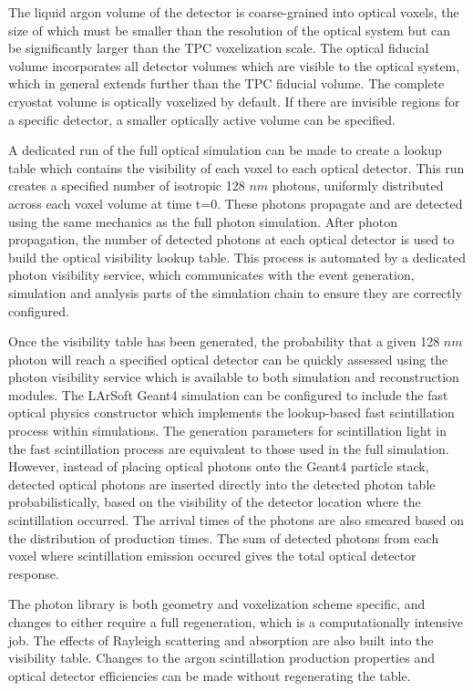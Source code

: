 \documentclass[12pt]{elsarticle}
\newcommand{\larsoft}{LArSoft }
\begin{document}
The liquid argon volume of the detector is coarse-grained into optical voxels, the size of which must be smaller than the resolution of the optical system but can be significantly larger than the TPC voxelization scale.  The optical fiducial volume incorporates all detector volumes which are visible to the optical system, which in general extends further than the TPC fiducial volume.  The complete cryostat volume is optically voxelized by default. If there are invisible regions for a specific detector, a smaller optically active volume can be specified.

A dedicated run of the full optical simulation can be made to create a lookup table which contains the visibility of each voxel to each optical detector.  This run creates a specified number of isotropic 128 $nm$ photons, uniformly distributed across each voxel volume at time t=0.  These photons propagate and are detected using the same mechanics as the full photon simulation.  After photon propagation, the number of detected photons at each optical detector is used to build the optical visibility lookup table.  This process is automated by a dedicated photon visibility service, which communicates with the event generation, simulation and analysis parts of the simulation chain to ensure they are correctly configured.

Once the visibility table has been generated, the probability that a given 128 $nm$ photon will reach a specified optical detector can be quickly assessed using the photon visibility service which is available to both simulation and reconstruction modules.  The \larsoft Geant4 simulation can be configured to include the fast optical physics constructor which implements the lookup-based fast scintillation process within simulations. The generation parameters for scintillation light in the fast scintillation process are equivalent to those used in the full simulation.  However, instead of placing optical photons onto the Geant4 particle stack, detected optical photons are inserted directly into the detected photon table probabilistically, based on the visibility of the detector location where the scintillation occurred.  The arrival times of the photons are also smeared based on the distribution of production times.  The sum of detected photons from each voxel where scintillation emission occured gives the total optical detector response.

The photon library is both geometry and voxelization scheme specific, and changes to either require a full regeneration, which is a computationally intensive job.  The effects of Rayleigh scattering and absorption are also built into the visibility table.  Changes to the argon scintillation production properties and optical detector efficiencies can be made without regenerating the table.
\end{document}
